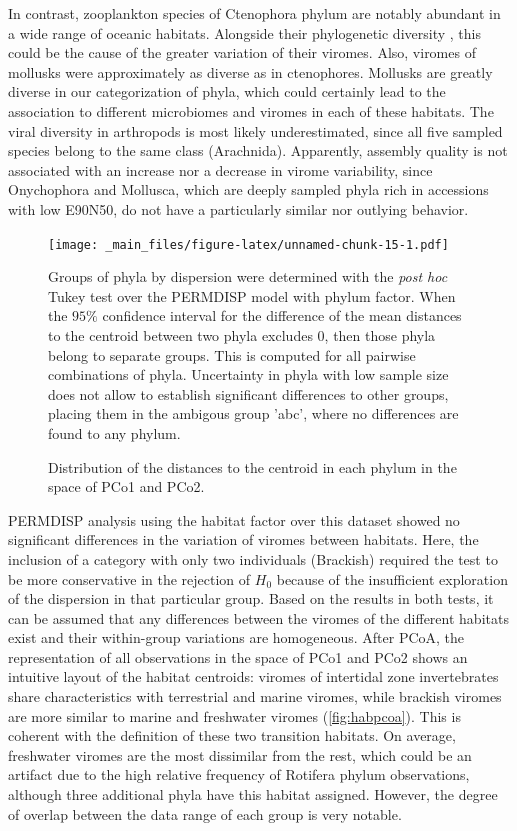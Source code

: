 \documentclass[
  openany]{book}
\begin{document}
In contrast, zooplankton species of Ctenophora phylum are notably abundant in a wide range of oceanic habitats. Alongside their phylogenetic diversity \autocite{Christianson2022}, this could be the cause of the greater variation of their viromes. Also, viromes of mollusks were approximately as diverse as in ctenophores. Mollusks are greatly diverse in our categorization of phyla, which could certainly lead to the association to different microbiomes and viromes in each of these habitats. The viral diversity in arthropods is most likely underestimated, since all five sampled species belong to the same class (Arachnida). Apparently, assembly quality is not associated with an increase nor a decrease in virome variability, since Onychophora and Mollusca, which are deeply sampled phyla rich in accessions with low E90N50, do not have a particularly similar nor outlying behavior.

\begin{figure}[!htbp]

\texttt{[image: \_main\_files/figure-latex/unnamed-chunk-15-1.pdf]}

\caption{Distribution of the distances to the centroid in each phylum in the space of PCo1 and PCo2.\label{fig:boxplotdisp}}
Groups of phyla by dispersion were determined with the \emph{post hoc} Tukey test over the PERMDISP model with phylum factor. When the $95\%$ confidence interval for the difference of the mean distances to the centroid between two phyla excludes 0, then those phyla belong to separate groups. This is computed for all pairwise combinations of phyla. Uncertainty in phyla with low sample size does not allow to establish significant differences to other groups, placing them in the ambigous group 'abc', where no differences are found to any phylum.

\end{figure}

PERMDISP analysis using the habitat factor over this dataset showed no significant differences in the variation of viromes between habitats. Here, the inclusion of a category with only two individuals (Brackish) required the test to be more conservative in the rejection of \(H_0\) because of the insufficient exploration of the dispersion in that particular group. Based on the results in both tests, it can be assumed that any differences between the viromes of the different habitats exist and their within-group variations are homogeneous. After PCoA, the representation of all observations in the space of PCo1 and PCo2 shows an intuitive layout of the habitat centroids: viromes of intertidal zone invertebrates share characteristics with terrestrial and marine viromes, while brackish viromes are more similar to marine and freshwater viromes (\ref{fig:habpcoa}). This is coherent with the definition of these two transition habitats. On average, freshwater viromes are the most dissimilar from the rest, which could be an artifact due to the high relative frequency of Rotifera phylum observations, although three additional phyla have this habitat assigned. However, the degree of overlap between the data range of each group is very notable.
\end{document}
